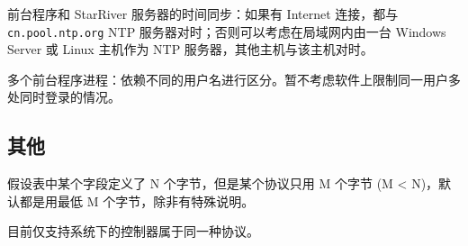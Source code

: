 前台程序和 StarRiver 服务器的时间同步：如果有 Internet 连接，都与
\texttt{cn.pool.ntp.org} NTP 服务器对时；否则可以考虑在局域网内由一台
Windows Server 或 Linux 主机作为 NTP 服务器，其他主机与该主机对时。

多个前台程序进程：依赖不同的用户名进行区分。暂不考虑软件上限制同一用户多处同时登录的情况。

\subsection{其他}\label{ux5176ux4ed6}

假设表中某个字段定义了 N 个字节，但是某个协议只用 M 个字节 (M
\textless{} N)，默认都是用最低 M 个字节，除非有特殊说明。

目前仅支持系统下的控制器属于同一种协议。
